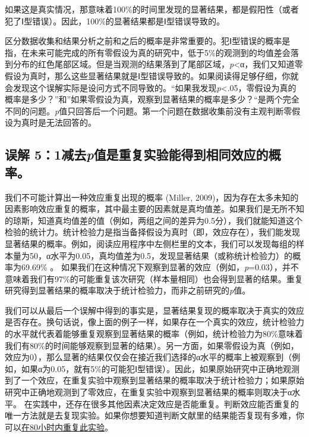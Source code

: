 \documentclass[
  letterpaper,
  DIV=11,
  numbers=noendperiod]{scrreprt}
\begin{document}
如果这是真实情况，那意味着100\%的时间里发现的显著结果，都是假阳性（或者犯了Ⅰ型错误）。因此，100\%的显著结果都是Ⅰ型错误导致的。

区分数据收集和结果分析之前和之后的概率是非常重要的。犯Ⅰ型错误的概率是指，在未来可能完成的所有零假设为真的研究中，低于5\%的观测到的均值差会落到分布的红色尾部区域。但是当观测的结果落到了尾部区域，\emph{p}\textless α，我们又知道零假设为真时，那么这些显著结果就是Ⅰ型错误导致的。如果阅读得足够仔细，你就会发现这个误解实际是设问方式不同导致的。``如果我发现\emph{p}\textless.05，零假设为真的概率是多少？''和''如果零假设为真，观察到显著结果的概率是多少？``是两个完全不同的问题。\emph{p}值只回答后一个问题。第一个问题在数据收集前没有主观判断零假设为真时是无法回答的。

\hypertarget{ux8befux89e3-51ux51cfux53bbpux503cux662fux91cdux590dux5b9eux9a8cux80fdux5f97ux5230ux76f8ux540cux6548ux5e94ux7684ux6982ux7387}{%
\subsection{\texorpdfstring{误解
5：1减去\emph{p}值是重复实验能得到相同效应的概率。}{误解 5：1减去p值是重复实验能得到相同效应的概率。}}\label{ux8befux89e3-51ux51cfux53bbpux503cux662fux91cdux590dux5b9eux9a8cux80fdux5f97ux5230ux76f8ux540cux6548ux5e94ux7684ux6982ux7387}}

我们不可能计算出一种效应重复出现的概率 (Miller,
2009)，因为存在太多未知的因素影响效应重复的概率，其中最主要的因素就是真均值差。如果我们是无所不知的琼斯，知道真均值差的值（例如，两组之间的差异为0.5分），我们就能知道这个检验的统计力。统计检验力是指当备择假设为真时（即，效应存在），我们能发现显著结果的概率。例如，阅读应用程序中左侧栏里的文本，我们可以发现每组的样本量为50，α水平为0.05，真均值差为0.5，发现显著结果（或称统计检验力）的概率为69.69\%
。
如果我们在这种情况下观察到显著的效应（例如，\emph{p}=0.03），并不意味着我们有97\%的可能重复该次研究（样本量相同）也会得到显著的结果。重复研究得到显著结果的概率取决于统计检验力，而非之前研究的\emph{p}值。

我们可以从最后一个误解中得到的事实是，显著结果复现的概率取决于真实的效应是否存在。换句话说，像上面的例子一样，如果存在一个真实的效应，统计检验力的水平就代表着能够重复观察到显著结果的概率（例如，统计检验力为80\%意味着我们有80\%的时间能够观察到显著的结果）。另一方面，如果零假设为真（例如，效应为0），那么显著的结果仅仅会在接近我们选择的α水平的概率上被观察到（例如，如果α为0.05，就有5\%的可能犯Ⅰ型错误）。因此，如果原始研究中正确地观测到了一个效应，在重复实验中观察到显著结果的概率取决于统计检验力；如果原始研究中正确地观测到了零效应，在重复实验中观察到显著结果的概率则取决于α水平。
在实践中，还存在很多其他因素决定效应是否能重复。判断效应能否重复的唯一方法就是去复现实验。如果你想要知道判断文献里的结果能否复现有多难，你可以\href{https://80000hours.org/psychology-replication-quiz/}{在80小时内重复此实验}。
\end{document}
